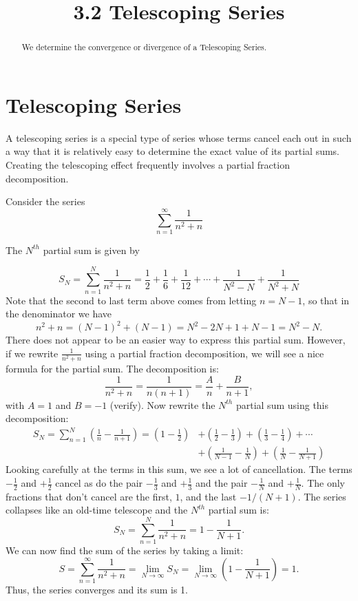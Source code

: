 \documentclass[handout]{ximera}
\title{3.2 Telescoping Series}
\begin{document}
\begin{abstract}
We determine the convergence or divergence of a Telescoping Series.
\end{abstract}

\maketitle

\section{Telescoping Series}

A telescoping series is a special type of series whose terms cancel each out in such a way that it is relatively easy to determine the
exact value of its partial sums. Creating the telescoping effect frequently involves a partial fraction decomposition.

\begin{example}[example 1]
Consider the series
\[
\sum_{n=1}^\infty \frac{1}{n^2 +n}
\]

The $N^{th}$ partial sum is given by

\[
S_N = \sum_{n=1}^N \frac{1}{n^2 +n} = \frac{1}{2} + \frac{1}{6} + \frac{1}{12} + \cdots + \frac{1}{N^2 - N} + \frac{1}{N^2 + N}
\]
Note that the second to last term above comes from letting $n = N-1$, so that in the denominator we have 
\[
n^2 + n = (N-1)^2 + (N-1) = N^2 - 2N + 1 + N - 1 = N^2 -N.
\]
There does not appear to be an easier way to express this partial sum.
However, if we rewrite $\frac{1}{n^2 +n}$ using a partial fraction decomposition, we will see a nice formula for the partial sum.
The decomposition is:
\[
\frac{1}{n^2 + n} = \frac{1}{n(n+1)} = \frac{A}{n} + \frac{B}{n+1}, 
\]
with $A = 1$ and $B=-1$ (verify).
Now rewrite the $N^{th}$ partial sum using this decomposition:
\begin{align*}
S_N = \sum_{n=1}^N \left(\frac{1}{n}-\frac{1}{n+1}\right)= \left(1  - \frac12 \right) &+ \left(\frac12 - \frac13 \right) + \left(\frac13 - \frac14 \right) + \cdots \\
&+ \left(\frac{1}{N-1} - \frac{1}{N} \right) +\left(\frac{1}{N} - \frac{1}{N+1} \right) 
\end{align*}
Looking carefully at the terms in this sum, we see a lot of cancellation. The terms $-\frac12$ and $+\frac12$ cancel as do the pair
 $-\frac13$ and $+\frac13$ and the pair $-\frac{1}{N}$ and $+\frac{1}{N}$. The only fractions that don't cancel are the first, $1$, and the last $-1/(N+1)$.
 The series collapses like an old-time telescope and the $N^{th}$ partial sum is:
\[
S_N = \sum_{n=1}^N \frac{1}{n^2 +n} = 1 - \frac{1}{N+1}.
\]
We can now find the sum of the series by taking a limit:
\[
S = \sum_{n=1}^\infty  \frac{1}{n^2 +n} = \lim_{N\to \infty} S_N = \lim_{N\to \infty} \left(1 - \frac{1}{N+1}\right) = 1.
\]
Thus, the series converges and its sum is 1.
\end{example}
\end{document}
